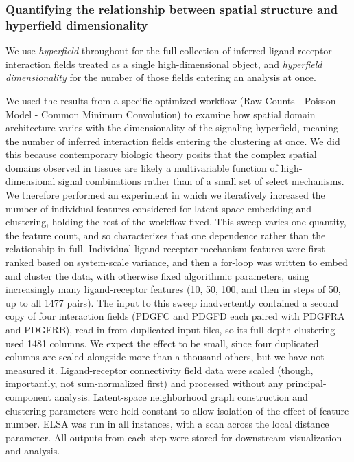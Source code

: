 \documentclass[10pt,letterpaper]{article}
\begin{document}
\subsubsection*{Quantifying the relationship between spatial structure and hyperfield dimensionality}

We use \textit{hyperfield} throughout for the full collection of inferred ligand-receptor interaction fields treated as a single high-dimensional object, and \textit{hyperfield dimensionality} for the number of those fields entering an analysis at once.

We used the results from a specific optimized workflow (Raw Counts - Poisson Model - Common Minimum Convolution) to examine how spatial domain architecture varies with the dimensionality of the signaling hyperfield, meaning the number of inferred interaction fields entering the clustering at once. We did this because contemporary biologic theory posits that the complex spatial domains observed in tissues are likely a multivariable function of high-dimensional signal combinations rather than of a small set of select mechanisms. We therefore performed an experiment in which we iteratively increased the number of individual features considered for latent-space embedding and clustering, holding the rest of the workflow fixed. This sweep varies one quantity, the feature count, and so characterizes that one dependence rather than the relationship in full. Individual ligand-receptor mechanism features were first ranked based on system-scale variance, and then a for-loop was written to embed and cluster the data, with otherwise fixed algorithmic parameters, using increasingly many ligand-receptor features (10, 50, 100, and then in steps of 50, up to all 1477 pairs). The input to this sweep inadvertently contained a second copy of four interaction fields (PDGFC and PDGFD each paired with PDGFRA and PDGFRB), read in from duplicated input files, so its full-depth clustering used 1481 columns. We expect the effect to be small, since four duplicated columns are scaled alongside more than a thousand others, but we have not measured it. Ligand-receptor connectivity field data were scaled (though, importantly, not sum-normalized first) and processed without any principal-component analysis. Latent-space neighborhood graph construction and clustering parameters were held constant to allow isolation of the effect of feature number. ELSA was run in all instances, with a scan across the local distance parameter. All outputs from each step were stored for downstream visualization and analysis.
\end{document}
